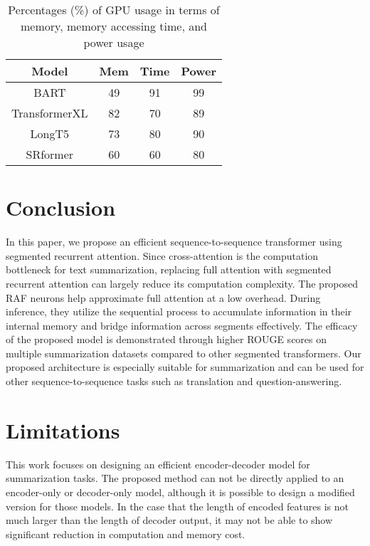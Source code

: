 \documentclass[11pt]{article}
\begin{document}
\begin{table}
    \centering
    \begin{tabular}{|c|c|c|c|}
       \hline
      Model &  Mem  &  Time& Power\\
       \hline
BART	&	49		&	91		&	99\\
TransformerXL		&	82		&	70		&	89\\
LongT5			&	73		&	80		&	90\\
SRformer	&	60		&	60		&	80\\

       \hline
    \end{tabular}
    \caption{Percentages (\%) of GPU usage in terms of memory, memory accessing time, and power usage}
    \label{tab:gpu}
\end{table}



\section{Conclusion}
In this paper, we propose an efficient sequence-to-sequence transformer using segmented recurrent attention. Since cross-attention is the computation bottleneck for text summarization, replacing full attention with segmented recurrent attention can largely reduce its computation complexity. The proposed RAF neurons help approximate full attention at a low overhead.  During inference, they utilize the sequential process to accumulate information in their internal memory and bridge information across segments effectively. The efficacy of the proposed model is demonstrated through higher ROUGE scores on multiple summarization datasets compared to other segmented transformers. Our proposed architecture is especially suitable for summarization and can be used for other sequence-to-sequence tasks such as translation and question-answering. 

\section*{Limitations}
This work focuses on designing an efficient encoder-decoder model for summarization tasks. The proposed method can not be directly applied to an encoder-only or decoder-only model, although it is possible to design a modified version for those models. In the case that the length of encoded features is not much larger than the length of decoder output, it may not be able to show significant reduction in computation and memory cost. 
\end{document}
